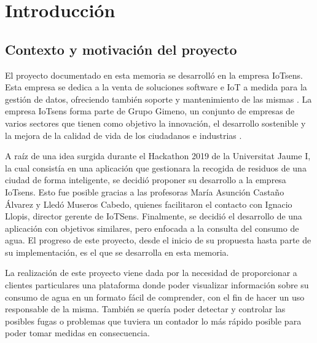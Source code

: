 \documentclass[pdftex,11pt,a4paper]{book}
\begin{document}
\cleardoublepage










\chapter{Introducción} \label{capitulo:introduccion}

\section{Contexto y motivación del proyecto}

El proyecto documentado en esta memoria se desarrolló en la empresa IoTsens. Esta empresa se dedica a la venta de soluciones software e IoT a medida para la gestión de datos, ofreciendo también soporte y mantenimiento de las mismas \cite{bib:IoTsens}. La empresa IoTsens forma parte de Grupo Gimeno, un conjunto de empresas de varios sectores que tienen como objetivo la innovación, el desarrollo sostenible y la mejora de la calidad de vida de los ciudadanos e industrias \cite{bib:grupo-gimeno}.

A raíz de una idea surgida durante el Hackathon 2019 de la Universitat Jaume I, la cual consistía en una aplicación que gestionara la recogida de residuos de una ciudad de forma inteligente, se decidió proponer su desarrollo a la empresa IoTsens. Esto fue posible gracias a las profesoras María Asunción Castaño Álvarez y Lledó Museros Cabedo, quienes facilitaron el contacto con Ignacio Llopis, director gerente de IoTSens. 
Finalmente, se decidió el desarrollo de una aplicación con objetivos similares, pero enfocada a la consulta del consumo de agua. El progreso de este proyecto, desde el inicio de su propuesta hasta parte de su implementación, es el que se desarrolla en esta memoria.

La realización de este proyecto viene dada por la necesidad de proporcionar a clientes particulares una plataforma donde poder visualizar información sobre su consumo de agua en un formato fácil de comprender, con el fin de hacer un uso responsable de la misma. También se quería poder detectar y controlar las posibles fugas o problemas que tuviera un contador lo más rápido posible para poder tomar medidas en consecuencia.
\end{document}
